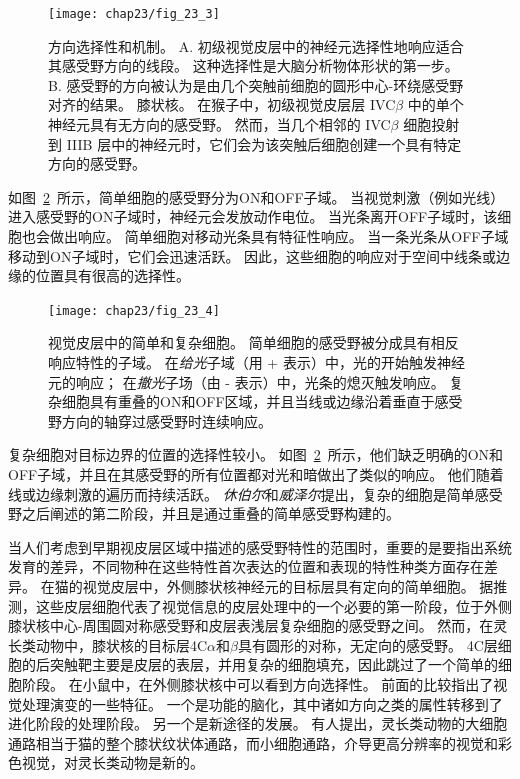 \begin{figure}[htbp]
	\centering
	\texttt{[image: chap23/fig\_23\_3]}
	\caption{方向选择性和机制。
		A. 初级视觉皮层中的神经元选择性地响应适合其感受野方向的线段。
		这种选择性是大脑分析物体形状的第一步\cite{hubel1968receptive}。
		B. 感受野的方向被认为是由几个突触前细胞的圆形中心-环绕感受野对齐的结果。 
		膝状核。
		在猴子中，初级视觉皮层层 IVC$\beta$ 中的单个神经元具有无方向的感受野。
		然而，当几个相邻的 IVC$\beta$ 细胞投射到 IIIB 层中的神经元时，它们会为该突触后细胞创建一个具有特定方向的感受野。}
	\label{fig:23_3}
\end{figure}


如图~\ref{fig:23_4}~所示，简单细胞的感受野分为ON和OFF子域。
当视觉刺激（例如光线）进入感受野的ON子域时，神经元会发放动作电位。
当光条离开OFF子域时，该细胞也会做出响应。
简单细胞对移动光条具有特征性响应。
当一条光条从OFF子域移动到ON子域时，它们会迅速活跃。
因此，这些细胞的响应对于空间中线条或边缘的位置具有很高的选择性。


\begin{figure}[htbp]
	\centering
	\texttt{[image: chap23/fig\_23\_4]}
	\caption{视觉皮层中的简单和复杂细胞。
		简单细胞的感受野被分成具有相反响应特性的子域。
		在\textit{给光}子域（用 + 表示）中，光的开始触发神经元的响应；
		在\textit{撤光}子场（由 - 表示）中，光条的熄灭触发响应。
		复杂细胞具有重叠的ON和OFF区域，并且当线或边缘沿着垂直于感受野方向的轴穿过感受野时连续响应。}
	\label{fig:23_4}
\end{figure}


复杂细胞对目标边界的位置的选择性较小。
如图~\ref{fig:23_4}~所示，他们缺乏明确的ON和OFF子域，并且在其感受野的所有位置都对光和暗做出了类似的响应。
他们随着线或边缘刺激的遍历而持续活跃。
\textit{休伯尔}和\textit{威泽尔}提出，复杂的细胞是简单感受野之后阐述的第二阶段，并且是通过重叠的简单感受野构建的。


当人们考虑到早期视皮层区域中描述的感受野特性的范围时，重要的是要指出系统发育的差异，不同物种在这些特性首次表达的位置和表现的特性种类方面存在差异。
在猫的视觉皮层中，外侧膝状核神经元的目标层具有定向的简单细胞。
据推测，这些皮层细胞代表了视觉信息的皮层处理中的一个必要的第一阶段，位于外侧膝状核中心-周围圆对称感受野和皮层表浅层复杂细胞的感受野之间。
然而，在灵长类动物中，膝状核的目标层4C$\alpha$和$\beta$具有圆形的对称，无定向的感受野。
4C层细胞的后突触靶主要是皮层的表层，并用复杂的细胞填充，因此跳过了一个简单的细胞阶段。
在小鼠中，在外侧膝状核中可以看到方向选择性。
前面的比较指出了视觉处理演变的一些特征。
一个是功能的脑化，其中诸如方向之类的属性转移到了进化阶段的处理阶段。
另一个是新途径的发展。
有人提出，灵长类动物的大细胞通路相当于猫的整个膝状纹状体通路，而小细胞通路，介导更高分辨率的视觉和彩色视觉，对灵长类动物是新的。


